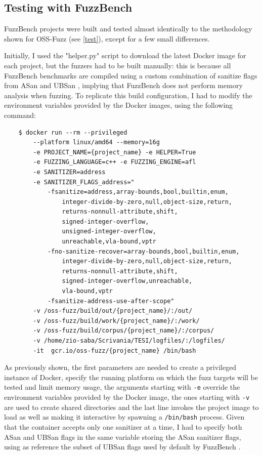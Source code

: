 \newpage
\subsection{Testing with FuzzBench}
FuzzBench projects were built and tested almost identically to the methodology shown for OSS-Fuzz (see \ref{test}), except for a few small differences.

Initially, I used the "helper.py" script to download the latest Docker image for each project, but the fuzzers had to be built manually: this is because all FuzzBench benchmarks are compiled using a custom combination of sanitize flags from ASan and UBSan \cite{flags}, implying that FuzzBench does not perform memory analysis when fuzzing. To replicate this build configuration, I had to modify the environment variables provided by the Docker images, using the following command:
\begin{verbatim}
    $ docker run --rm --privileged 
        --platform linux/amd64 --memory=16g 
        -e PROJECT_NAME={project_name} -e HELPER=True 
        -e FUZZING_LANGUAGE=c++ -e FUZZING_ENGINE=afl 
        -e SANITIZER=address 
        -e SANITIZER_FLAGS_address="
            -fsanitize=address,array-bounds,bool,builtin,enum,
                integer-divide-by-zero,null,object-size,return,
                returns-nonnull-attribute,shift,
                signed-integer-overflow,
                unsigned-integer-overflow,
                unreachable,vla-bound,vptr
            -fno-sanitize-recover=array-bounds,bool,builtin,enum,
                integer-divide-by-zero,null,object-size,return,
                returns-nonnull-attribute,shift,
                signed-integer-overflow,unreachable,
                vla-bound,vptr 
            -fsanitize-address-use-after-scope" 
        -v /oss-fuzz/build/out/{project_name}/:/out/  
        -v /oss-fuzz/build/work/{project_name}/:/work/
        -v /oss-fuzz/build/corpus/{project_name}/:/corpus/
        -v /home/zio-saba/Scrivania/TESI/logfiles/:/logfiles/  
        -it  gcr.io/oss-fuzz/{project_name} /bin/bash
\end{verbatim}
As previously shown, the first parameters are needed to create a privileged instance of Docker, specify the running platform on which the fuzz targets will be tested and limit memory usage, the arguments starting with \verb|-e| override the environment variables provided by the Docker image, the ones starting with \verb|-v| are used to create shared directories and the last line invokes the project image to load as well as making it interactive by spawning a \verb|/bin/bash| process.
Given that the container accepts only one sanitizer at a time, I had to specify both ASan and UBSan flags in the same variable storing the ASan sanitizer flags, using as reference the subset of UBSan flags used by default by FuzzBench \cite{flags}.

